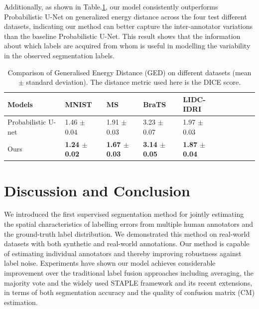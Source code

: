 Additionally, as shown in Table.\ref{ged_result}, our model consistently outperforms Probabilistic U-Net on generalized energy distance across the four test different datasets, indicating our method can better capture the inter-annotator variations than the baseline Probabilistic U-Net. This result shows that the information about which labels are acquired from whom is useful in modelling the variability in the observed segmentation labels. 

\begin{table}[t!]
	\center
	\footnotesize
	\begin{tabular}{@{}llllllllll}
		\hline
		 Models & MNIST & MS  & BraTS  & LIDC-IDRI  \\
		\hline	
		Probabilistic U-net \cite{kohl2018probabilistic}  & 1.46 $\pm$ 0.04 & 1.91 $\pm$ 0.03  & 3.23 $\pm$ 0.07  &  1.97 $\pm$ 0.03  \\
		Ours & \textbf{1.24 $\pm$ 0.02} & \textbf{1.67 $\pm$ 0.03}  & \textbf{3.14 $\pm$ 0.05}  &  \textbf{1.87 $\pm$ 0.04}  \\
		\hline
	\end{tabular}%
\caption{\footnotesize Comparison of Generalised Energy Distance (GED) on different datasets (mean $\pm$ standard deviation). The distance metric used here is the DICE score.}
\label{ged_result}
\end{table}



\section{Discussion and Conclusion}
We introduced the first supervised segmentation method for jointly estimating the spatial characteristics of labelling errors from multiple human annotators and the ground-truth label distribution. We demonstrated this method on real-world datasets with both synthetic and real-world annotations. Our method is capable of estimating individual annotators and thereby improving robustness against label noise. Experiments have shown our model achieves considerable improvement over the traditional label fusion approaches including averaging, the majority vote and the widely used STAPLE framework and its recent extensions, in terms of both segmentation accuracy and the quality of confusion matrix (CM) estimation.


